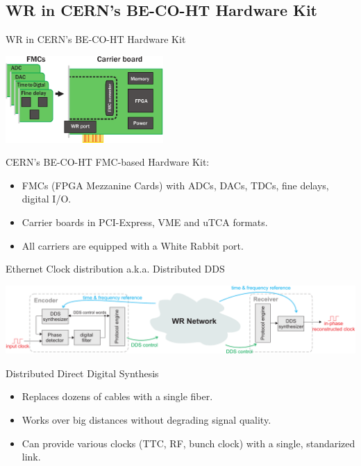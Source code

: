 \documentclass[compress,red]{beamer}
\begin{document}
\subsection{WR in CERN's BE-CO-HT Hardware Kit}
\begin{frame}{WR in CERN's BE-CO-HT Hardware Kit}
\begin{center}

  \includegraphics[width=6cm]{../../figures/node/shw_kit}

  \begin{block}{CERN's BE-CO-HT FMC-based Hardware Kit:}
    \begin{itemize}
    \item FMCs (FPGA Mezzanine Cards) with ADCs, DACs, TDCs, fine delays, digital I/O.
    \item Carrier boards in PCI-Express, VME and uTCA formats.
    \item All carriers are equipped with a White Rabbit port.
    \end{itemize}
  \end{block}

\end{center}
\end{frame}


\begin{frame}{Ethernet Clock distribution a.k.a. Distributed DDS}
  \begin{center}
    \includegraphics[width=\columnwidth]{../../figures/applications/remote_dds.pdf}
  \end{center}
  \begin{block}{Distributed Direct Digital Synthesis}
    \begin{itemize}
    \item Replaces dozens of cables with a single fiber.
    \item Works over big distances without degrading signal quality.
    \item Can provide various clocks (TTC, RF, bunch clock) with a single, standarized link.
    \end{itemize}
  \end{block}
\end{frame}
\end{document}
